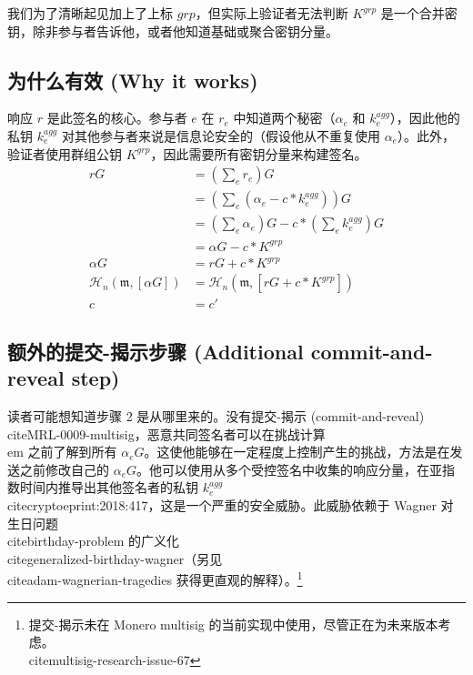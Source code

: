 我们为了清晰起见加上了上标 $grp$，但实际上验证者无法判断 $K^{grp}$ 是一个合并密钥，除非参与者告诉他，或者他知道基础或聚合密钥分量。


\subsection*{为什么有效 (Why it works)}

响应 $r$ 是此签名的核心。参与者 $e$ 在 $r_e$ 中知道两个秘密（$\alpha_e$ 和 $k^{agg}_e$），因此他的私钥 $k^{agg}_e$ 对其他参与者来说是信息论安全的（假设他从不重复使用 $\alpha_e$）。此外，验证者使用群组公钥 $K^{grp}$，因此需要所有密钥分量来构建签名。
\begin{align*}
    r G &= (\sum_e r_e) G \\
      &= (\sum_e (\alpha_e - c*k^{agg}_e)) G \\
      &= (\sum_e \alpha_e) G - c*(\sum_e k^{agg}_e) G \\
      &= \alpha G - c*K^{grp} \\
    \alpha G &= r G + c*K^{grp} \\
    \mathcal{H}_n(\mathfrak{m},[\alpha G]) &= \mathcal{H}_n(\mathfrak{m},[r G + c*K^{grp}]) \\
    c &= c'
\end{align*}


\subsection*{额外的提交-揭示步骤 (Additional commit-and-reveal step)}

读者可能想知道步骤 2 是从哪里来的。没有提交-揭示 (commit-and-reveal) \\cite{MRL-0009-multisig}，恶意共同签名者可以在挑战计算{\\em 之前}了解到所有 $\alpha_e G$。这使他能够在一定程度上控制产生的挑战，方法是在发送之前修改自己的 $\alpha_e G$。他可以使用从多个受控签名中收集的响应分量，在亚指数时间内推导出其他签名者的私钥 $k^{agg}_e$ \\cite{cryptoeprint:2018:417}，这是一个严重的安全威胁。此威胁依赖于 Wagner 对生日问题 \\cite{birthday-problem} 的广义化 \\cite{generalized-birthday-wagner}（另见 \\cite{adam-wagnerian-tragedies} 获得更直观的解释）。\footnote{提交-揭示未在 Monero multisig 的当前实现中使用，尽管正在为未来版本考虑。\\cite{multisig-research-issue-67}}


